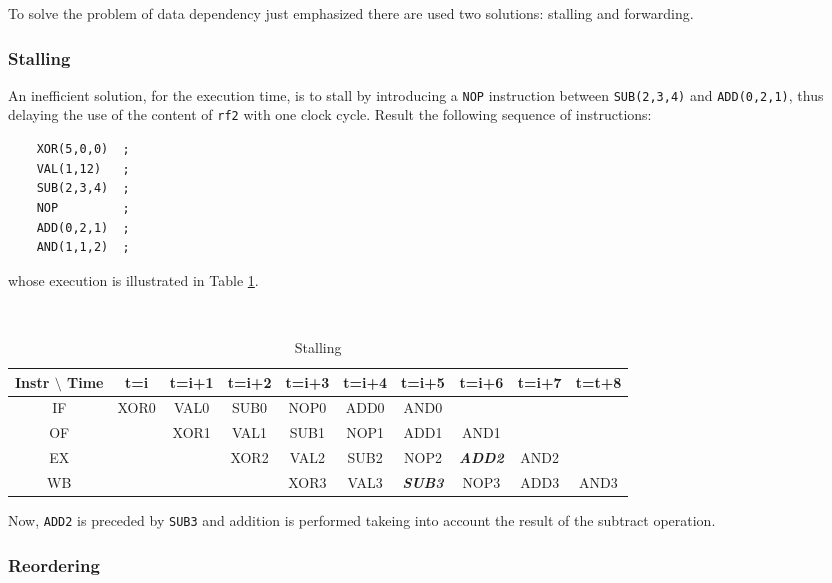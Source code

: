To solve the problem of data dependency just emphasized there are used two solutions: stalling and forwarding.

\subsubsection{Stalling}

An inefficient solution, for the execution time, is to stall by introducing a {\tt NOP} instruction between {\tt SUB(2,3,4)} and {\tt ADD(0,2,1)}, thus delaying the use of the content of {\tt rf2} with one clock cycle. Result the following sequence of instructions:
\begin{verbatim}
    XOR(5,0,0)  ;
    VAL(1,12)   ;
    SUB(2,3,4)  ;
    NOP         ;
    ADD(0,2,1)  ;
    AND(1,1,2)  ;
\end{verbatim}
whose execution is illustrated in Table \ref{stall}.

\begin{table}[H]
  \begin{center}
    \caption{Stalling}
    \label{stall}
    {\small
    {\tt
    \begin{tabular}{|c||c|c|c|c|c|c|c|c|c|}
      \hline
     Instr $\setminus$ Time & t=i & t=i+1 & t=i+2 & t=i+3 & t=i+4 & t=i+5 & t=i+6 & t=i+7 & t=t+8   \\ \hline \hline
        IF      & XOR0 & VAL0   & SUB0   & NOP0   & ADD0   & AND0   &     &       &         \\ \hline
        OF      &     & XOR1   & VAL1   & SUB1   & NOP1   & ADD1   & AND1   &         &         \\ \hline
        EX      &     &       & XOR2   & VAL2   & SUB2   & NOP2   & {\footnotesize {\bf {\em ADD2}}}   & AND2   &       \\ \hline
        WB      &     &       &       & XOR3   & VAL3   & {\footnotesize {\bf {\em SUB3}}}   & NOP3   & ADD3   & AND3       \\ \hline
    \end{tabular}
    }
    }
  \end{center}
\end{table}
Now, {\tt ADD2} is preceded by {\tt SUB3} and addition is performed takeing into account the result of the subtract operation.

\subsubsection{Reordering}

